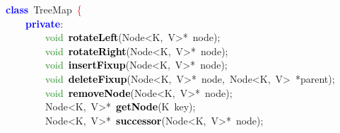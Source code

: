 \begin{center}\begin{minipage}{120mm}
\noindent
\mbox{}\textbf{\textcolor{Blue}{class}}\ \textcolor{TealBlue}{TreeMap}\ \textcolor{Red}{\{} \\
\mbox{}\ \ \ \ \textbf{\textcolor{Blue}{private}}\textcolor{BrickRed}{:} \\
\mbox{}\ \ \ \ \ \ \ \ \textcolor{ForestGreen}{void}\ \textbf{\textcolor{Black}{rotateLeft}}\textcolor{BrickRed}{(}Node\textcolor{BrickRed}{\textless{}}K\textcolor{BrickRed}{,}\ V\textcolor{BrickRed}{\textgreater{}*}\ node\textcolor{BrickRed}{);} \\
\mbox{}\ \ \ \ \ \ \ \ \textcolor{ForestGreen}{void}\ \textbf{\textcolor{Black}{rotateRight}}\textcolor{BrickRed}{(}Node\textcolor{BrickRed}{\textless{}}K\textcolor{BrickRed}{,}\ V\textcolor{BrickRed}{\textgreater{}*}\ node\textcolor{BrickRed}{);} \\
\mbox{}\ \ \ \ \ \ \ \ \textcolor{ForestGreen}{void}\ \textbf{\textcolor{Black}{insertFixup}}\textcolor{BrickRed}{(}Node\textcolor{BrickRed}{\textless{}}K\textcolor{BrickRed}{,}\ V\textcolor{BrickRed}{\textgreater{}*}\ node\textcolor{BrickRed}{);} \\
\mbox{}\ \ \ \ \ \ \ \ \textcolor{ForestGreen}{void}\ \textbf{\textcolor{Black}{deleteFixup}}\textcolor{BrickRed}{(}\textcolor{TealBlue}{Node\textless{}K,\ V\textgreater{}*\ node,\ Node\textless{}K,\ V\textgreater{}}\ \textcolor{BrickRed}{*}parent\textcolor{BrickRed}{);} \\
\mbox{}\ \ \ \ \ \ \ \ \textcolor{ForestGreen}{void}\ \textbf{\textcolor{Black}{removeNode}}\textcolor{BrickRed}{(}Node\textcolor{BrickRed}{\textless{}}K\textcolor{BrickRed}{,}\ V\textcolor{BrickRed}{\textgreater{}*}\ node\textcolor{BrickRed}{);} \\
\mbox{}\ \ \ \ \ \ \ \ Node\textcolor{BrickRed}{\textless{}}K\textcolor{BrickRed}{,}\ V\textcolor{BrickRed}{\textgreater{}*}\ \textbf{\textcolor{Black}{getNode}}\textcolor{BrickRed}{(}\textcolor{TealBlue}{K}\ key\textcolor{BrickRed}{);} \\
\mbox{}\ \ \ \ \ \ \ \ Node\textcolor{BrickRed}{\textless{}}K\textcolor{BrickRed}{,}\ V\textcolor{BrickRed}{\textgreater{}*}\ \textbf{\textcolor{Black}{successor}}\textcolor{BrickRed}{(}Node\textcolor{BrickRed}{\textless{}}K\textcolor{BrickRed}{,}\ V\textcolor{BrickRed}{\textgreater{}*}\ node\textcolor{BrickRed}{);} 
\end{minipage}\end{center}

